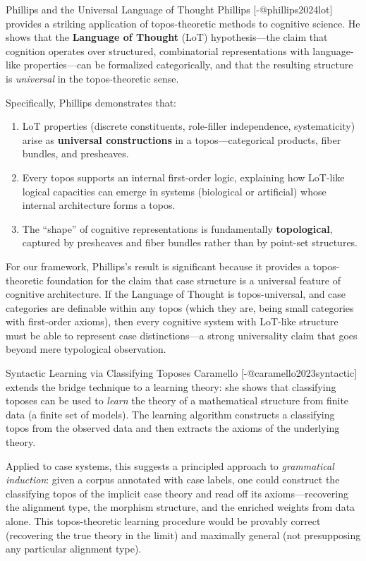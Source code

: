 \documentclass[
  ignorenonframetext,
]{beamer}
\begin{document}
\begin{frame}{Phillips and the Universal Language of Thought}
\protect{}\label{phillips-and-the-universal-language-of-thought}
Phillips {[}-@phillips2024lot{]} provides a striking application of
topos-theoretic methods to cognitive science. He shows that the
\textbf{Language of Thought} (LoT) hypothesis---the claim that cognition
operates over structured, combinatorial representations with
language-like properties---can be formalized categorically, and that the
resulting structure is \emph{universal} in the topos-theoretic sense.

Specifically, Phillips demonstrates that:

\begin{enumerate}
\item
  LoT properties (discrete constituents, role-filler independence,
  systematicity) arise as \textbf{universal constructions} in a
  topos---categorical products, fiber bundles, and presheaves.
\item
  Every topos supports an internal first-order logic, explaining how
  LoT-like logical capacities can emerge in systems (biological or
  artificial) whose internal architecture forms a topos.
\item
  The ``shape'' of cognitive representations is fundamentally
  \textbf{topological}, captured by presheaves and fiber bundles rather
  than by point-set structures.
\end{enumerate}

For our framework, Phillips's result is significant because it provides
a topos-theoretic foundation for the claim that case structure is a
universal feature of cognitive architecture. If the Language of Thought
is topos-universal, and case categories are definable within any topos
(which they are, being small categories with first-order axioms), then
every cognitive system with LoT-like structure must be able to represent
case distinctions---a strong universality claim that goes beyond mere
typological observation.
\end{frame}

\begin{frame}{Syntactic Learning via Classifying Toposes}
\protect{}\label{syntactic-learning-via-classifying-toposes}
Caramello {[}-@caramello2023syntactic{]} extends the bridge technique to
a learning theory: she shows that classifying toposes can be used to
\emph{learn} the theory of a mathematical structure from finite data (a
finite set of models). The learning algorithm constructs a classifying
topos from the observed data and then extracts the axioms of the
underlying theory.

Applied to case systems, this suggests a principled approach to
\emph{grammatical induction}: given a corpus annotated with case labels,
one could construct the classifying topos of the implicit case theory
and read off its axioms---recovering the alignment type, the morphism
structure, and the enriched weights from data alone. This
topos-theoretic learning procedure would be provably correct (recovering
the true theory in the limit) and maximally general (not presupposing
any particular alignment type).
\end{frame}
\end{document}
